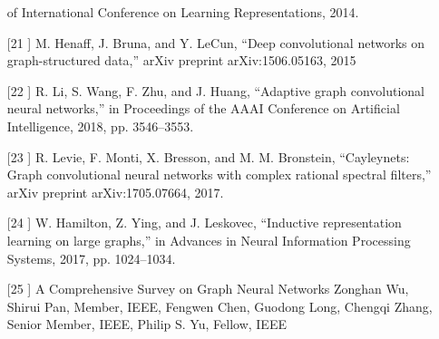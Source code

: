 \documentclass[UTF8]{ctexart}
\begin{document}
\begin{itemize}
of International Conference on Learning Representations, 2014.
\item [[21]]
M. Henaff, J. Bruna, and Y. LeCun, “Deep convolutional networks
on graph-structured data,” arXiv preprint arXiv:1506.05163, 2015
\item [[22]]
R. Li, S. Wang, F. Zhu, and J. Huang, “Adaptive graph convolutional neural networks,” in Proceedings of the AAAI Conference on
Artificial Intelligence, 2018, pp. 3546–3553.
\item [[23]]
R. Levie, F. Monti, X. Bresson, and M. M. Bronstein, “Cayleynets:
Graph convolutional neural networks with complex rational
spectral filters,” arXiv preprint arXiv:1705.07664, 2017.
\item [[24]]
W. Hamilton, Z. Ying, and J. Leskovec, “Inductive representation
learning on large graphs,” in Advances in Neural Information
Processing Systems, 2017, pp. 1024–1034.
\item [[25]]
A Comprehensive Survey on Graph Neural
Networks
Zonghan Wu, Shirui Pan, Member, IEEE, Fengwen Chen, Guodong Long,
Chengqi Zhang, Senior Member, IEEE, Philip S. Yu, Fellow, IEEE
\end{itemize}
\end{document}
